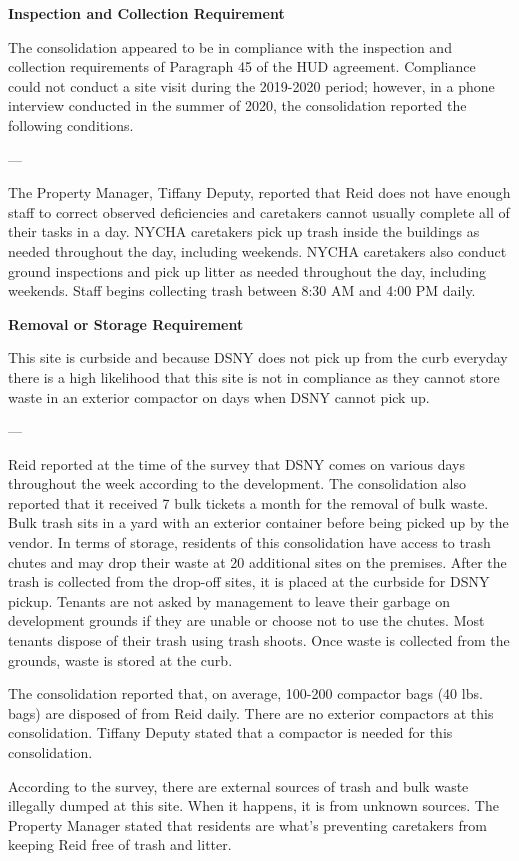  

\textbf{Inspection and Collection Requirement} 

 

The consolidation appeared to be in compliance with the inspection and collection requirements of Paragraph 45 of the HUD agreement. Compliance could not conduct a site visit during the 2019-2020 period; however, in a phone interview conducted in the summer of 2020, the consolidation reported the following conditions.

 

--- 

The Property Manager, Tiffany Deputy, reported that Reid does not have enough staff to correct observed deficiencies and caretakers cannot usually complete all of their tasks in a day. NYCHA caretakers pick up trash inside the buildings as needed throughout the day, including weekends. NYCHA caretakers also conduct ground inspections and pick up litter as needed throughout the day, including weekends. Staff begins collecting trash between 8:30 AM and 4:00 PM daily. 

 

\textbf{Removal or Storage Requirement} 

 

This site is curbside and because DSNY does not pick up from the curb everyday there is a high likelihood that this site is not in compliance as they cannot store waste in an exterior compactor on days when DSNY cannot pick up.

 

 

 

--- 

Reid reported at the time of the survey that DSNY comes on various days throughout the week according to the development. The consolidation also reported that it received 7 bulk tickets a month for the removal of bulk waste. Bulk trash sits in a yard with an exterior container before being picked up by the vendor. In terms of storage, residents of this consolidation have access to trash chutes and may drop their waste at 20 additional sites on the premises. After the trash is collected from the drop-off sites, it is placed at the curbside for DSNY pickup. Tenants are not asked by management to leave their garbage on development grounds if they are unable or choose not to use the chutes. Most tenants dispose of their trash using trash shoots. Once waste is collected from the grounds, waste is stored at the curb.  

 

 

The consolidation reported that, on average, 100-200 compactor bags (40 lbs. bags) are disposed of from Reid daily. There are no exterior compactors at this consolidation. Tiffany Deputy stated that a compactor is needed for this consolidation.  

 

According to the survey, there are external sources of trash and bulk waste illegally dumped at this site. When it happens, it is from unknown sources. The Property Manager stated that residents are what's preventing caretakers from keeping Reid free of trash and litter. 

 